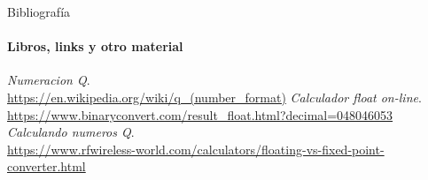  \begin{frame}{Bibliografía}
    \framesubtitle{Libros, links y otro material}
    \tiny{
       \begin{thebibliography}{1}
             \emph{Numeracion Q}. \\
             \href {https://en.wikipedia.org/wiki/q_(number_format)}{https://en.wikipedia.org/wiki/q\_(number\_format)}
             \emph{Calculador float on-line}. \\
             \href {https://www.binaryconvert.com/result\_float.html?decimal=048046053}{https://www.binaryconvert.com/result\_float.html?decimal=048046053}
             \emph{Calculando numeros Q}. \\
             \href {https://www.rfwireless-world.com/calculators/floating-vs-fixed-point-converter.html}{https://www.rfwireless-world.com/calculators/floating-vs-fixed-point-converter.html}
       \end{thebibliography}
    }
 \end{frame}
\appendix
